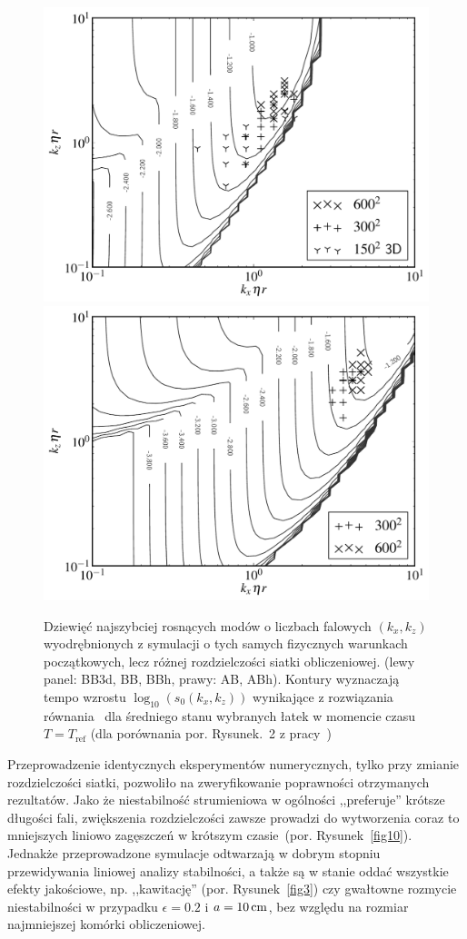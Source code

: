 \begin{figure}
  \includegraphics[width=0.48\linewidth]{figures/fig9a}
  \includegraphics[width=0.48\linewidth]{figures/fig9b}
  \caption{Dziewięć najszybciej rosnących modów o liczbach falowych $(k_x, k_z)$
     wyodrębnionych z symulacji o tych samych fizycznych warunkach początkowych,
     lecz różnej rozdzielczości siatki obliczeniowej. (lewy panel: BB3d, BB,
     BBh, prawy: AB, ABh). Kontury wyznaczają tempo wzrostu $\log_{10}( s_0(k_x,
  k_z))$ wynikające z rozwiązania równania~  dla średniego
  stanu wybranych łatek w momencie czasu  $T = T_{\textrm{ref}}$ (dla porównania
  por. Rysunek.~2 z pracy~\cite{YG05})}
   \label{fig9}
\end{figure}
 
\par Przeprowadzenie identycznych eksperymentów numerycznych, tylko przy zmianie
rozdzielczości siatki, pozwoliło na zweryfikowanie poprawności otrzymanych
rezultatów. Jako że niestabilność strumieniowa w ogólności ,,preferuje'' krótsze
długości fali, zwiększenia rozdzielczości zawsze prowadzi do wytworzenia coraz
to mniejszych liniowo zagęszczeń w krótszym czasie~(por. Rysunek~\ref{fig10}).
Jednakże przeprowadzone symulacje odtwarzają w dobrym stopniu przewidywania
liniowej analizy stabilności, a także są w stanie oddać wszystkie efekty
jakościowe, np. ,,kawitację'' (por. Rysunek~\ref{fig3}) czy gwałtowne rozmycie
niestabilności w przypadku $\epsilon=0.2$ i $a=10\hbox{$\thinspace\textrm{cm}$}$, bez względu na rozmiar
najmniejszej komórki obliczeniowej.

